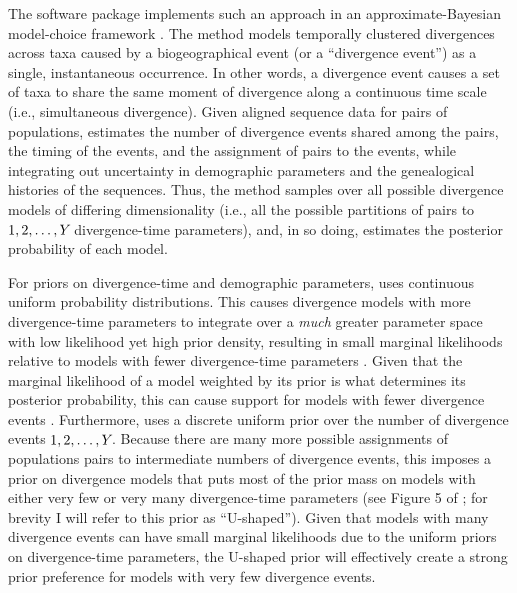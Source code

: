 The software package \msb implements such an approach in an
approximate-Bayesian model-choice framework \cite{Hickerson2006,Huang2011}.
The method models temporally clustered divergences across taxa caused by a
biogeographical event (or a ``divergence event'') as a single, instantaneous
occurrence.
In other words, a divergence event causes a set of taxa to share the same
moment of divergence along a continuous time scale (i.e., simultaneous
divergence).
Given aligned sequence data for \npairs{} pairs of populations, \msb 
estimates the number of divergence events shared among the pairs, the timing of
the events, and the assignment of pairs to the events, while integrating out
uncertainty in demographic parameters and the genealogical histories of the
sequences.
Thus, the method samples over all possible divergence models of differing
dimensionality (i.e., all the possible partitions of \npairs{} pairs to
$1,2,\ldots,Y_{}$ divergence-time parameters), and, in so doing, estimates
the posterior probability of each model.

For priors on divergence-time and demographic parameters, \msb uses continuous
uniform probability distributions.
This causes divergence models with more divergence-time parameters to integrate
over a \emph{much} greater parameter space with low likelihood yet high prior
density, resulting in small marginal likelihoods relative to models with fewer
divergence-time parameters \cite{Jeffreys1939,Lindley1957}.
Given that the marginal likelihood of a model weighted by its prior is what
determines its posterior probability, this can cause support for models with
fewer divergence events \cite{Oaks2012,Oaks2014reply}.
Furthermore, \msb uses a discrete uniform prior over the number of divergence
events $1,2,\ldots,Y_{}$.
Because there are many more possible assignments of populations pairs to
intermediate numbers of divergence events, this imposes a prior on divergence
models that puts most of the prior mass on models with either very few or very
many divergence-time parameters (see Figure 5 of \cite{Oaks2012}; for brevity
I will refer to this prior as ``U-shaped'').
Given that models with many divergence events can have small marginal
likelihoods due to the uniform priors on divergence-time parameters, the
U-shaped prior will effectively create a strong prior preference for models
with very few divergence events.

